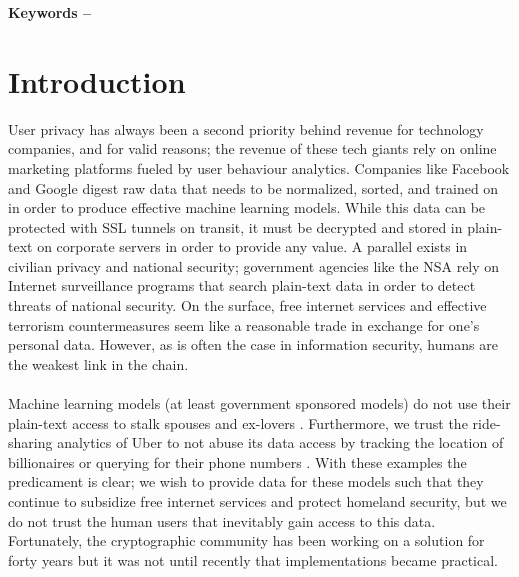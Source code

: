 \documentclass[10pt, a4paper]{article}
\title{\mytitle}
\author{\myauthor\hspace{1em}\\\contact\\Edinburgh Napier University\hspace{0.5em}-\hspace{0.5em}\mymodule}
\date{}
\begin{document}
	\maketitle
	\begin{abstract}
		Test
	\end{abstract}
    
	\textbf{Keywords -- }{\mykeywords}

	\section{Introduction}
	
	User privacy has always been a second priority behind revenue for technology companies, and for valid reasons; the revenue of these tech giants rely on  online marketing platforms fueled by user behaviour analytics. Companies like Facebook and Google digest raw data that needs to be normalized, sorted, and trained on in order to produce effective machine learning models. While this data can be protected with SSL tunnels on transit, it must be decrypted and stored in plain-text on corporate servers in order to provide any value. A parallel exists in civilian privacy and national security; government agencies like the NSA rely on Internet surveillance programs that search plain-text data in order to detect threats of national security. On the surface, free internet services and effective terrorism countermeasures seem like a reasonable trade in exchange for one's personal data. However, as is often the case in information security, humans are the weakest link in the chain. 
	\paragraph{}Machine learning models (at least government sponsored models) do not use their plain-text access to stalk spouses and ex-lovers \cite{Selyukh:2013}. Furthermore, we trust the ride-sharing analytics of Uber to not abuse its data access by tracking the location of billionaires or querying for their phone numbers \cite{pymnts}. With these examples the predicament is clear; we wish to provide data for these models such that they continue to subsidize free internet services and protect homeland security, but we do not trust the human users that inevitably gain access to this data. Fortunately, the cryptographic community has been working on a solution for forty years  but it was not until recently that implementations became practical. 
\end{document}

